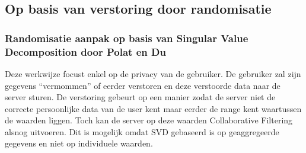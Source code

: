 
\subsection{Op basis van verstoring door randomisatie}
\label{randomisatie}
\subsubsection{Randomisatie aanpak op basis van Singular Value Decomposition door Polat en Du \cite{Polat:2005:SCF:1066677.1066860}}

Deze werkwijze focust enkel op de privacy van de gebruiker. De gebruiker zal zijn gegevens “vermommen” of eerder verstoren en deze verstoorde data naar de server sturen. De verstoring gebeurt op een manier zodat de server niet de correcte persoonlijke data van de user kent maar eerder de range kent waartussen de waarden liggen. Toch kan de server op deze waarden Collaborative Filtering alsnog uitvoeren. Dit is mogelijk omdat SVD gebaseerd is op geaggregeerde gegevens en niet op individuele waarden.


